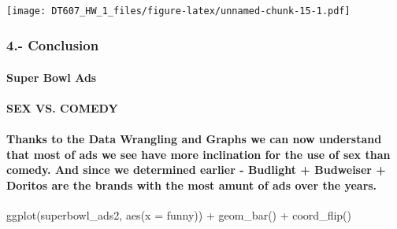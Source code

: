 \documentclass[
]{article}
\newenvironment{Shaded}{\begin{snugshade}}{\end{snugshade}}
\newcommand{\AttributeTok}[1]{\textcolor[rgb]{0.77,0.63,0.00}{#1}}
\newcommand{\FunctionTok}[1]{\textcolor[rgb]{0.00,0.00,0.00}{#1}}
\newcommand{\NormalTok}[1]{#1}
\newcommand{\SpecialCharTok}[1]{\textcolor[rgb]{0.00,0.00,0.00}{#1}}
\begin{document}
\texttt{[image: DT607\_HW\_1\_files/figure-latex/unnamed-chunk-15-1.pdf]}

\hypertarget{section-4}{%
\subparagraph*{}\label{section-4}}

\hypertarget{conclusion}{%
\subsubsection{4.- Conclusion}\label{conclusion}}

\hypertarget{super-bowl-ads}{%
\paragraph{Super Bowl Ads}\label{super-bowl-ads}}

\hypertarget{sex-vs.-comedy}{%
\paragraph{SEX VS. COMEDY}\label{sex-vs.-comedy}}

\hypertarget{thanks-to-the-data-wrangling-and-graphs-we-can-now-understand-that-most-of-ads-we-see-have-more-inclination-for-the-use-of-sex-than-comedy.-and-since-we-determined-earlier---budlight-budweiser-doritos-are-the-brands-with-the-most-amunt-of-ads-over-the-years.}{%
\paragraph{Thanks to the Data Wrangling and Graphs we can now understand
that most of ads we see have more inclination for the use of sex than
comedy. And since we determined earlier - Budlight + Budweiser + Doritos
are the brands with the most amunt of ads over the
years.}\label{thanks-to-the-data-wrangling-and-graphs-we-can-now-understand-that-most-of-ads-we-see-have-more-inclination-for-the-use-of-sex-than-comedy.-and-since-we-determined-earlier---budlight-budweiser-doritos-are-the-brands-with-the-most-amunt-of-ads-over-the-years.}}

\begin{Shaded}
\begin{Highlighting}[]
\FunctionTok{ggplot}\NormalTok{(superbowl\_ads2, }\FunctionTok{aes}\NormalTok{(}\AttributeTok{x =}\NormalTok{ funny)) }\SpecialCharTok{+} 
  \FunctionTok{geom\_bar}\NormalTok{() }\SpecialCharTok{+}
  \FunctionTok{coord\_flip}\NormalTok{()}
\end{Highlighting}
\end{Shaded}
\end{document}
